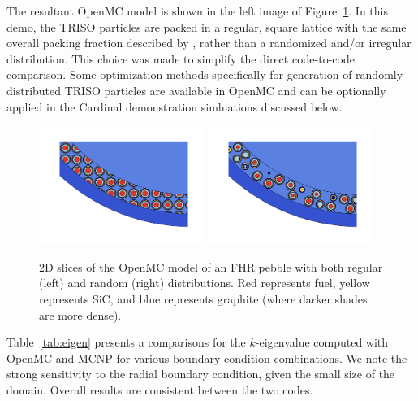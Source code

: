 The resultant OpenMC model is shown in the left image of Figure~\ref{f:openmc_pebble}.  In this demo, the TRISO particles are packed in a regular, square lattice with the same overall packing fraction described by \cite{phillips2010}, rather than a randomized and/or irregular distribution.  This choice was made to simplify the direct code-to-code comparison. Some optimization methods specifically for generation of randomly distributed TRISO particles are available in OpenMC \cite{openmcdocs_triso} and can be optionally applied in the Cardinal demonstration simluations discussed below.

\begin{figure}[!h]
\centering
\includegraphics[clip=true,width=0.48\textwidth]{Figures/pebble_yz_cropped_regular.png}
\includegraphics[clip=true,width=0.48\textwidth]{Figures/pebble_yz_cropped_random.png}
\caption{2D slices of the OpenMC model of an FHR pebble with both regular (left) and random (right) distributions.  Red represents fuel, yellow represents
SiC, and blue represents graphite (where darker shades are more dense).}
\label{f:openmc_pebble}
\end{figure}

Table~\ref{tab:eigen} presents a comparisons for the $k$-eigenvalue computed with OpenMC and MCNP for various boundary condition combinations. We note the strong sensitivity to the radial boundary condition, given the small size of the domain. Overall results are consistent between the two codes.

